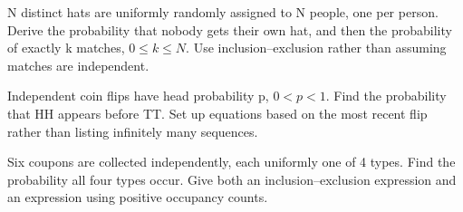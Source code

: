 \documentclass[11pt]{article}
\newcommand{\qid}[1]{\par\needspace{5\baselineskip}\noindent{\color{accent}\bfseries #1}\quad}
\begin{document}
\qid{P2} N distinct hats are uniformly randomly assigned to N people, one per person. Derive the probability that nobody gets their own hat, and then the probability of exactly k matches, \(0\le k\le N\). Use inclusion--exclusion rather than assuming matches are independent.
\par\vspace{0.40in}

\qid{P3} Independent coin flips have head probability p, \(0<p<1\). Find the probability that HH appears before TT. Set up equations based on the most recent flip rather than listing infinitely many sequences.
\par\vspace{0.40in}

\qid{P4} Six coupons are collected independently, each uniformly one of 4 types. Find the probability all four types occur. Give both an inclusion--exclusion expression and an expression using positive occupancy counts.
\par\vspace{0.40in}
\end{document}
